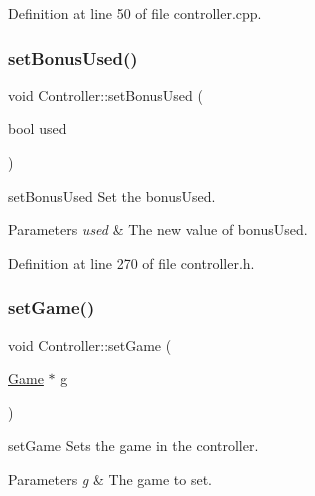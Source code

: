 Definition at line 50 of file controller.\+cpp.

\mbox{\label{class_controller_a6a06f685c0fdb19ceac20199db9916cd}} 
\subsubsection{\texorpdfstring{set\+Bonus\+Used()}{setBonusUsed()}}
{\footnotesize\ttfamily void Controller\+::set\+Bonus\+Used (\begin{DoxyParamCaption}\item[{bool}]{used }\end{DoxyParamCaption})\hspace{0.3cm}{\ttfamily [inline]}}



set\+Bonus\+Used Set the bonus\+Used. 


\begin{DoxyParams}{Parameters}
{\em used} & The new value of bonus\+Used. \\
\hline
\end{DoxyParams}


Definition at line 270 of file controller.\+h.

\mbox{\label{class_controller_a7c1d65311fed834ed285040cd24cb320}} 
\subsubsection{\texorpdfstring{set\+Game()}{setGame()}}
{\footnotesize\ttfamily void Controller\+::set\+Game (\begin{DoxyParamCaption}\item[{\hyperlink{class_game}{Game} $\ast$}]{g }\end{DoxyParamCaption})\hspace{0.3cm}{\ttfamily [inline]}}



set\+Game Sets the game in the controller. 


\begin{DoxyParams}{Parameters}
{\em g} & The game to set. \\
\hline
\end{DoxyParams}


